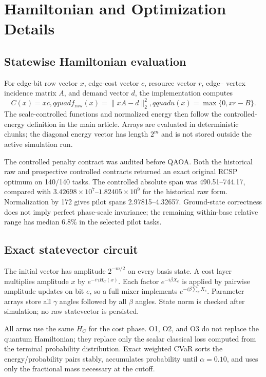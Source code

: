 \section{Hamiltonian and Optimization Details}
\label{app:optimization}

\subsection{Statewise Hamiltonian evaluation}

For edge-bit row vector $x$, edge-cost vector $c$, resource vector $r$, edge--
vertex incidence matrix $A$, and demand vector $d$, the implementation computes
\begin{equation}
 C(x)=xc,qquad
 f_{\mathrm{raw}}(x)=\|xA-d\|_2^2,qquad
 u(x)=\max\{0,xr-B\}.
\end{equation}
The scale-controlled functions and normalized energy then follow the
controlled-energy definition in the main article. Arrays are evaluated in deterministic chunks;
the diagonal energy vector has length $2^m$ and is not stored outside the
active simulation run.

The controlled penalty contract was audited before QAOA. Both the historical
raw and prospective controlled contracts returned an exact original RCSP
optimum on 140/140 tasks. The controlled absolute span was 490.51--744.17,
compared with $3.42698\times10^7$--$1.82405\times10^9$ for the historical raw
form. Normalization by 172 gives pilot spans 2.97815--4.32657. Ground-state
correctness does not imply perfect phase-scale invariance; the remaining
within-base relative range has median 6.8\% in the selected pilot tasks.

\subsection{Exact statevector circuit}

The initial vector has amplitude $2^{-m/2}$ on every basis state. A cost layer
multiplies amplitude $x$ by $e^{-i\gamma H_C(x)}$. Each factor
$e^{-i\beta X_e}$ is applied by pairwise amplitude updates on bit $e$, so a
full mixer implements $e^{-i\beta\sum_eX_e}$. Parameter arrays store all
$\gamma$ angles followed by all $\beta$ angles. State norm is checked after
simulation; no raw statevector is persisted.

All arms use the same $H_C$ for the cost phase. O1, O2, and O3 do not replace
the quantum Hamiltonian; they replace only the scalar classical loss computed
from the terminal probability distribution. Exact weighted CVaR sorts the
energy/probability pairs stably, accumulates probability until $\alpha=0.10$,
and uses only the fractional mass necessary at the cutoff.

